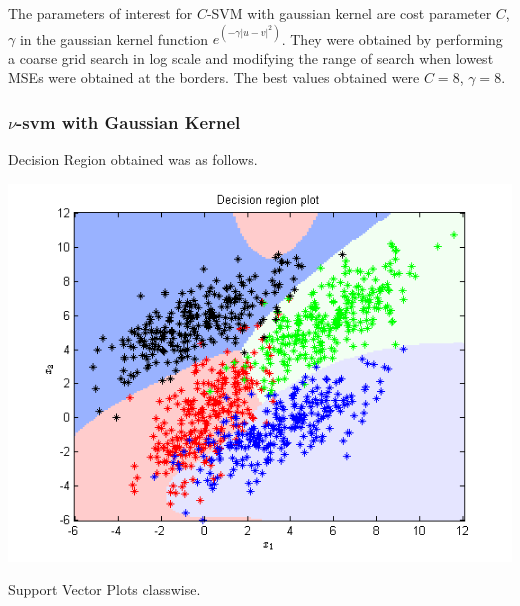 \documentclass{article}
\begin{document}
The parameters of interest for $C$-SVM with gaussian kernel are cost parameter $C$, $\gamma$ in the gaussian kernel function $e^{(-\gamma|u-v|^{2})}$. They were obtained by performing a coarse grid search in log scale and modifying the range of search when lowest MSEs were obtained at the borders.
The best values obtained were $C=8$, $\gamma=8$.




\subsubsection{$\nu$-svm with Gaussian Kernel}
Decision Region obtained was as follows.
\begin{center}
\includegraphics[scale=1]{Classification/1c/nu_g/dec}
\end{center}
Support Vector Plots classwise.
\end{document}
